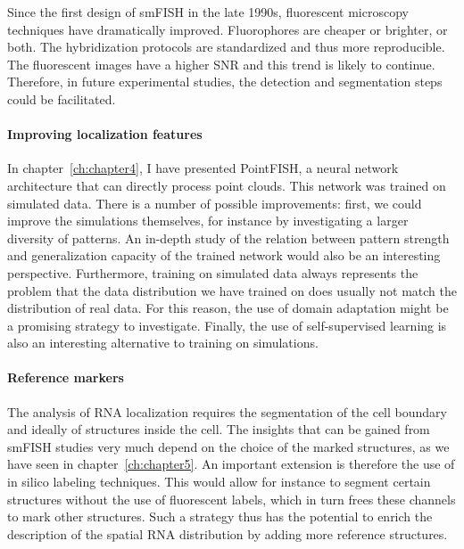 Since the first design of \ac{smFISH} in the late 1990s, fluorescent microscopy techniques have dramatically improved.
Fluorophores are cheaper or brighter, or both.
The hybridization protocols are standardized and thus more reproducible.
The fluorescent images have a higher \ac{SNR} and this trend is likely to continue.
Therefore, in future experimental studies, the detection and segmentation steps could be facilitated.

\paragraph{Improving localization features}
In chapter~\ref{ch:chapter4}, I have presented PointFISH, a neural network architecture that can directly process point clouds.
This network was trained on simulated data.
There is a number of possible improvements: first, we could improve the simulations themselves, for instance by investigating a larger diversity of patterns.
An in-depth study of the relation between pattern strength and generalization capacity of the trained network would also be an interesting perspective.
Furthermore, training on simulated data always represents the problem that the data distribution we have trained on does usually not match the distribution of real data.
For this reason, the use of domain adaptation might be a promising strategy to investigate.
Finally, the use of self-supervised learning is also an interesting alternative to training on simulations.

\paragraph{Reference markers}
The analysis of \ac{RNA} localization requires the segmentation of the cell boundary and ideally of structures inside the cell.
The insights that can be gained from \ac{smFISH} studies very much depend on the choice of the marked structures, as we have seen in chapter~\ref{ch:chapter5}.
An important extension is therefore the use of in silico labeling techniques.
This would allow for instance to segment certain structures without the use of fluorescent labels, which in turn frees these channels to mark other structures.
Such a strategy thus has the potential to enrich the description of the spatial \ac{RNA} distribution by adding more reference structures.

